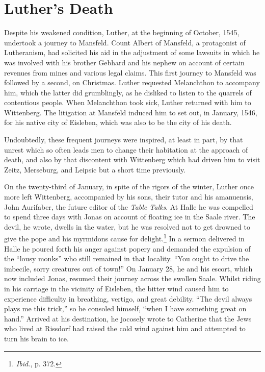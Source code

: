 \section{Luther’s Death}

Despite his weakened condition, Luther, at the beginning of October,
1545, undertook a journey to Mansfeld. Count Albert of
Mansfeld, a protagonist of Lutheranism, had solicited his aid in the
adjustment of some lawsuits in which he was involved with his
brother Gebhard and his nephew on account of certain revenues
from mines and various legal claims. This first journey to Mansfeld
was followed by a second, on Christmas. Luther requested Melanchthon to
accompany him, which the latter did grumblingly, as he
disliked to listen to the quarrels of contentious people. When Melanchthon
took sick, Luther returned with him to Wittenberg. The litigation
at Mansfeld induced him to set out, in January, 1546, for his
native city of Eisleben, which was also to be the city of his death.

Undoubtedly, these frequent journeys were inspired, at least in part,
by that unrest which so often leads men to change their habitation at
the approach of death, and also by that discontent with Wittenberg
which had driven him to visit Zeitz, Merseburg, and Leipsic but a
short time previously.

On the twenty-third of January, in spite of the rigors of the winter,
Luther once more left Wittenberg, accompanied by his sons, their
tutor and his amanuensis, John Aurifaber, the future editor of the
\textit{Table Talks}. At Halle he was compelled to spend three days with
Jonas on account of floating ice in the Saale river. The devil, he wrote,
dwells in the water, but he was resolved not to get drowned to give
the pope and his myrmidons cause for delight.\footnote{\textit{Ibid.}, p. 372.}
 In a sermon delivered
in Halle he poured forth his anger against popery and demanded the
expulsion of the “lousy monks” who still remained in that locality.
“You ought to drive the imbecile, sorry creatures out of town!” On
January 28, he and his escort, which now included Jonas, resumed
their journey across the swollen Saale. Whilst riding in his carriage in
the vicinity of Eisleben, the bitter wind caused him to experience difficulty
in breathing, vertigo, and great debility. “The devil always
plays me this trick,” so he consoled himself, “when I have something
great on hand.” Arrived at his destination, he jocosely wrote to Catherine
that the Jews who lived at Rissdorf had raised the cold wind
against him and attempted to turn his brain to ice.

